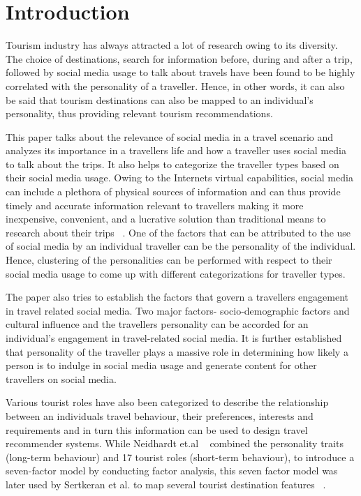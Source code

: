 \section{Introduction}
		
Tourism industry has always attracted a lot of research owing to its diversity. The choice of destinations, search for information before, during and after a trip, followed by social media usage to talk about travels have been found to be highly correlated with the personality of a traveller. Hence, in other words, it can also be said that tourism destinations can also be mapped to an individual’s personality, thus providing relevant tourism recommendations.


This paper talks about the relevance of social media in a travel scenario and analyzes its importance in a traveller\textquotesingle s life and how a traveller uses social media to talk about the trips.
It also helps to categorize the traveller types based on their social media usage. Owing to the Internet\textquotesingle s virtual capabilities, social media can include a plethora of physical sources of information and can thus provide timely and accurate information relevant to travellers making it more inexpensive, convenient, and a lucrative solution than traditional means to research about their trips ~\cite{amaro2016travelers}. One of the factors that can be attributed to the use of social media by an individual traveller can be the personality of the individual. Hence, clustering of the personalities can be performed with respect to their social media usage to come up with different categorizations for traveller types.
				
The paper also tries to establish the factors that govern a traveller\textquotesingle s engagement in travel related social media. Two major factors- socio-demographic factors and cultural influence and the traveller\textquotesingle s personality can be accorded for an individual's engagement in travel-related social media. It is further established that personality of the traveller plays a massive role in determining how likely a person is to indulge in social media usage and generate content for other travellers on social media. 

Various tourist roles have also been categorized to describe the relationship between an individual\textquotesingle s travel behaviour, their preferences, interests and requirements and in turn this information can be used to design travel recommender systems. While Neidhardt et.al ~\cite{neidhardt2015picture, neidhardt2014eliciting} combined the personality traits (long-term behaviour) and 17
tourist roles (short-term behaviour), to introduce a seven-factor
model by conducting factor analysis, this seven factor model was later used by Sertkeran et al. to map several tourist destination features ~\cite{sertkan2018mapping}.



